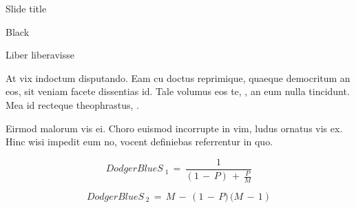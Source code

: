 \documentclass{MichiganTech}
\begin{document}
%
\begin{frame}[t]{Slide title}
  \vspace*{0.10in}
  \begin{reference}{4mm}{85.5mm}{Black}
    \;
  \end{reference}

  \begin{beamerboxesrounded}[upper=brainstormboxhead,lower=brainstormboxbody,shadow=true]{Liber liberavisse}
    \begin{flushleft}
      At vix indoctum disputando. Eam cu doctus reprimique, quaeque democritum
      an eos, sit veniam facete dissentias id. Tale volumus eos te, ,
      an eum nulla tincidunt. Mea id recteque theophrastus, .

      \vspace*{0.10in}
      Eirmod malorum vis ei. Choro euismod incorrupte in vim, ludus ornatus 
      vis ex. Hinc wisi impedit eum no, vocent definiebas referrentur in quo. 

      \vspace*{0.10in}
      \begin{equation*}
        \boxed{DodgerBlue}{S_{\mathrm{\;1}} \,=\, \frac{1}{\left(1 \,-\, P\right)\, +\, \frac{P}{M}}}
      \end{equation*}

      \vspace*{0.10in}
      \begin{equation*}
        \boxed{DodgerBlue}{S_{\mathrm{\;2}} \,=\, M \,-\, \left( 1 \,-\, P)\,(M \,-\, 1\right)}
      \end{equation*}

      \vspace*{0.10in}
    \end{flushleft}
  \end{beamerboxesrounded}
\end{frame}
\end{document}
